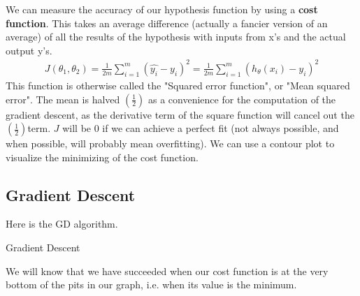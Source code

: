 \documentclass{article}
\makeatletter
\def\BState{\State\hskip-\ALG@thistlm}
\makeatother
\begin{document}
            We can measure the accuracy of our hypothesis function by using a \textbf{cost function}. This takes an average difference (actually a fancier version of an average)
            of all the results of the hypothesis with inputs from x's and the actual output y's.
            \begin{align*}
                J(\theta_{1},\theta_{2}) = \frac{1}{2m}\sum_{i=1}^{m}(\hat{y_i} - y_i)^2 = \frac{1}{2m}\sum_{i=1}^{m}(h_{\theta}(x_i)- y_i)^2 
            \end{align*}
            This function is otherwise called the "Squared error function", or "Mean squared error". The mean is halved $\left(\frac{1}{2}\right)$
            as a convenience for the computation of the gradient descent, as the derivative term of the square function will cancel out the $\left(\frac{1}{2}\right)$ 
    ​	     term. $J$ will be 0 if we can achieve a perfect fit (not always possible, and when possible, will probably mean overfitting). We can use a contour plot to
            visualize the minimizing of the cost function.

        \subsection{Gradient Descent}

            Here is the GD algorithm.
            \begin{algorithm}
                \caption{Gradient Descent}\label{euclid}
            \end{algorithm}
            
            We will know that we have succeeded when our cost function is at the very bottom of the pits in our graph, i.e. when its value is the minimum. 
            
\end{document}
